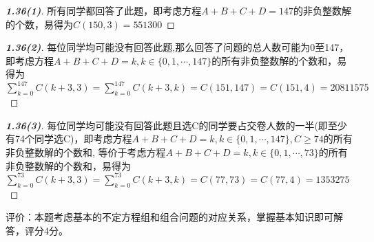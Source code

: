 \documentclass[12pt]{article}
\begin{document}
\begin{proof}[\textbf{1.36(1)}]
    所有同学都回答了此题，即考虑方程$A+B+C+D = 147$的非负整数解的个数，易得为$C(150,3) = 551300$
\end{proof}

\begin{proof}[\textbf{1.36(2)}]
    每位同学均可能没有回答此题,那么回答了问题的总人数可能为0至147，即考虑方程$A+B+C+D = k, k \in \{0, 1, \cdots, 147\}$的所有非负整数解的个数和，易得为$\sum_{k = 0}^{147} C(k+3, 3) = \sum_{k = 0}^{147} C(k+3, k) = C(151,147) = C(151,4) = 20811575$
\end{proof}

\begin{proof}[\textbf{1.36(3)}]
    每位同学均可能没有回答此题且选C的同学要占交卷人数的一半(即至少有74个同学选C)，即考虑方程$A+B+C+D = k, k \in \{0, 1, \cdots, 147\}, C \geq 74$的所有非负整数解的个数和, 等价于考虑方程$A+B+C+D = k, k \in \{0, 1, \cdots, 73\}$的所有非负整数解的个数和，易得为$\sum_{k = 0}^{73} C(k+3, 3) = \sum_{k = 0}^{73} C(k+3, k) = C(77,73) = C(77,4) = 1353275$
\end{proof}
评价：本题考虑基本的不定方程组和组合问题的对应关系，掌握基本知识即可解答，评分4分。

 
 
\end{document}
